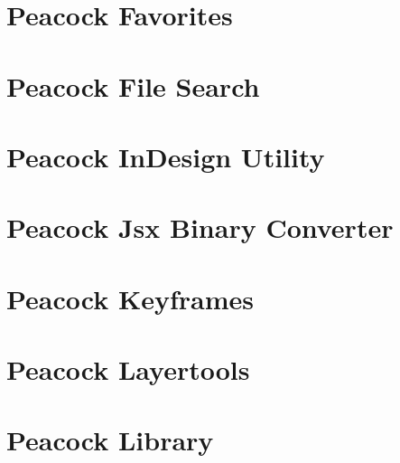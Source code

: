 \documentclass[a4paper,11pt,openany,oneside,english]{sphinxmanual}
\begin{document}
\begin{figure}[htbp]
\centering

\noindent{}
\end{figure}


\section{Peacock Favorites}
\label{\detokenize{modules/favorites/readme:peacock-favorites}}\label{\detokenize{modules/favorites/readme::doc}}

\section{Peacock File Search}
\label{\detokenize{modules/filesearch/readme:peacock-file-search}}\label{\detokenize{modules/filesearch/readme::doc}}

\section{Peacock InDesign Utility}
\label{\detokenize{modules/in_utils/readme:peacock-indesign-utility}}\label{\detokenize{modules/in_utils/readme::doc}}

\section{Peacock Jsx Binary Converter}
\label{\detokenize{modules/jsxbinaryconverter/readme:peacock-jsx-binary-converter}}\label{\detokenize{modules/jsxbinaryconverter/readme::doc}}

\section{Peacock Keyframes}
\label{\detokenize{modules/keyframes/readme:peacock-keyframes}}\label{\detokenize{modules/keyframes/readme::doc}}

\section{Peacock Layertools}
\label{\detokenize{modules/layertools/readme:peacock-layertools}}\label{\detokenize{modules/layertools/readme::doc}}

\section{Peacock Library}
\label{\detokenize{modules/library/readme:peacock-library}}\label{\detokenize{modules/library/readme::doc}}
\end{document}
